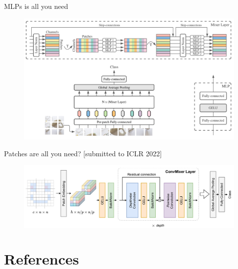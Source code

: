 \documentclass[xcolor=pdftex,dvipsnames,table,mathserif]{beamer}
\begin{document}
\begin{frame}{MLPs is all you need~\cite{tolstikhin_mlp-mixer_2021}}

  \begin{figure}[ht]
    \centering
    \includegraphics[width=\textwidth]{mixer}
  \end{figure}

\end{frame}


\begin{frame}{Patches are all you need? [submitted to ICLR 2022]}

\begin{figure}[ht]
  \centering
  \includegraphics[width=\textwidth]{conv_mixer}
\end{figure}


\end{frame}



\section*{References}


\end{document}
